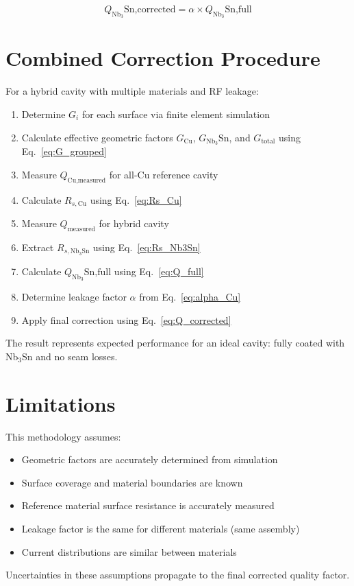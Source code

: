 \begin{equation}
Q_\text{Nb}_3\text{Sn,corrected} = \alpha \times Q_\text{Nb}_3\text{Sn,full}
\label{eq:Q_corrected}
\end{equation}

\section{Combined Correction Procedure}

For a hybrid cavity with multiple materials and RF leakage:

\begin{enumerate}
    \item Determine $G_i$ for each surface via finite element simulation
    \item Calculate effective geometric factors $G_\text{Cu}$, $G_\text{Nb}_3\text{Sn}$, and $G_\text{total}$ using Eq.~\ref{eq:G_grouped}
    \item Measure $Q_\text{Cu,measured}$ for all-Cu reference cavity
    \item Calculate $R_{s,\text{Cu}}$ using Eq.~\ref{eq:Rs_Cu}
    \item Measure $Q_\text{measured}$ for hybrid cavity
    \item Extract $R_{s,\text{Nb}_3\text{Sn}}$ using Eq.~\ref{eq:Rs_Nb3Sn}
    \item Calculate $Q_\text{Nb}_3\text{Sn,full}$ using Eq.~\ref{eq:Q_full}
    \item Determine leakage factor $\alpha$ from Eq.~\ref{eq:alpha_Cu}
    \item Apply final correction using Eq.~\ref{eq:Q_corrected}
\end{enumerate}

The result represents expected performance for an ideal cavity: fully coated with Nb$_3$Sn and no seam losses.

\section{Limitations}

This methodology assumes:
\begin{itemize}
    \item Geometric factors are accurately determined from simulation
    \item Surface coverage and material boundaries are known
    \item Reference material surface resistance is accurately measured
    \item Leakage factor is the same for different materials (same assembly)
    \item Current distributions are similar between materials
\end{itemize}

Uncertainties in these assumptions propagate to the final corrected quality factor.